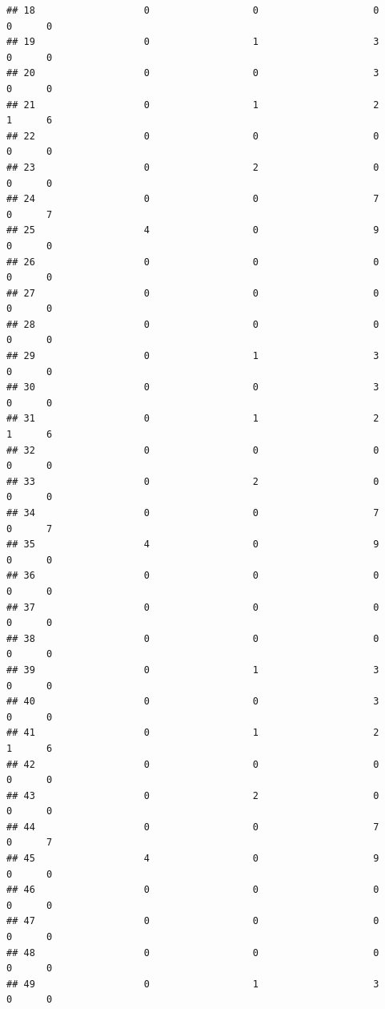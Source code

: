 \documentclass[
]{article}
\begin{document}
\begin{verbatim}
## 18                   0                  0                    0        0      0
## 19                   0                  1                    3        0      0
## 20                   0                  0                    3        0      0
## 21                   0                  1                    2        1      6
## 22                   0                  0                    0        0      0
## 23                   0                  2                    0        0      0
## 24                   0                  0                    7        0      7
## 25                   4                  0                    9        0      0
## 26                   0                  0                    0        0      0
## 27                   0                  0                    0        0      0
## 28                   0                  0                    0        0      0
## 29                   0                  1                    3        0      0
## 30                   0                  0                    3        0      0
## 31                   0                  1                    2        1      6
## 32                   0                  0                    0        0      0
## 33                   0                  2                    0        0      0
## 34                   0                  0                    7        0      7
## 35                   4                  0                    9        0      0
## 36                   0                  0                    0        0      0
## 37                   0                  0                    0        0      0
## 38                   0                  0                    0        0      0
## 39                   0                  1                    3        0      0
## 40                   0                  0                    3        0      0
## 41                   0                  1                    2        1      6
## 42                   0                  0                    0        0      0
## 43                   0                  2                    0        0      0
## 44                   0                  0                    7        0      7
## 45                   4                  0                    9        0      0
## 46                   0                  0                    0        0      0
## 47                   0                  0                    0        0      0
## 48                   0                  0                    0        0      0
## 49                   0                  1                    3        0      0

\end{verbatim}
\end{document}
